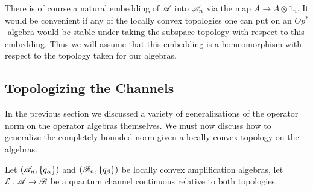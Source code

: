 \documentclass[../main.tex]{subfiles}
\begin{document}
There is of course a natural embedding of $\mathscr{A}$ into $\mathscr{A}_n$ via the map 
$A \to A \otimes 1_n$. It would be convenient if any of the locally convex 
topologies one can put on an $Op^*$-algebra would be stable under taking the 
subspace topology with respect to this embedding. Thus we will assume that this 
embedding is a homeomorphism with respect to the topology taken for our algebras.

\subsection{Topologizing the Channels}

In the previous section we discussed a variety of generalizations of the operator norm
on the operator algebras themselves. We must now discuss how to generalize the completely
bounded norm given a locally convex topology on the algebras.

Let $(\mathscr{A}_n, \{q_\alpha\})$ and $(\mathscr{B}_n, \{q_\beta\})$
be locally convex amplification algebras, let $\mathcal{E}:\mathscr{A} \to \mathscr{B}$ be a quantum
channel continuous relative to both topologies.
\end{document}
